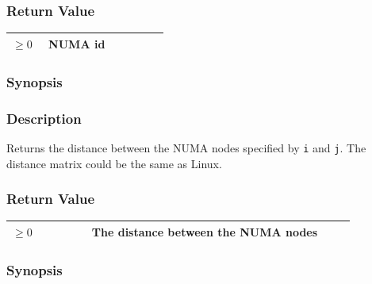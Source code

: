 \documentclass[twoside,11pt,fleqn]{book}
\begin{document}
\subsubsection*{Return Value}{\quad}
\begin{table}[!h]
\footnotesize
\begin{tabular}{|p{0.20\linewidth}|p{0.66\linewidth}|} \hline
$\ge 0$&NUMA id\\ \hline
\end{tabular}
\vspace{-0em}
\end{table}
\FloatBarrier

\subsubsection{}
\subsubsection*{Synopsis}{\quad}

\subsubsection*{Description}{\quad}
Returns the distance between the NUMA nodes specified by \texttt{i} and \texttt{j}.
The distance matrix could be the same as Linux.

\subsubsection*{Return Value}{\quad}
\begin{table}[!h]
\footnotesize
\begin{tabular}{|p{0.20\linewidth}|p{0.66\linewidth}|} \hline
$\ge 0$&The distance between the NUMA nodes\\ \hline
\end{tabular}
\vspace{-0em}
\end{table}
\FloatBarrier

\subsubsection{}
\subsubsection*{Synopsis}{\quad}
\end{document}
